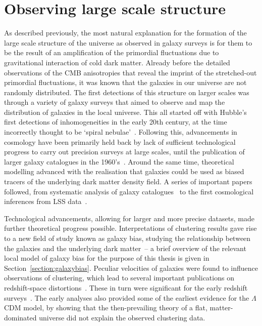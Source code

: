 \section{Observing large scale structure}

As described previously, the most natural explanation for the formation of the large scale structure of the universe as observed in galaxy surveys is for them to be the result of an amplification of the primordial fluctuations due to gravitational interaction of cold dark matter. Already before the detailed observations of the CMB anisotropies that reveal the imprint of the stretched-out primordial fluctuations, it was known that the galaxies in our universe are not randomly distributed. The first detections of this structure on larger scales was through a variety of galaxy surveys that aimed to observe and map the distribution of galaxies in the local universe. This all started off with Hubble's first detections of inhomogeneities in the early 20th century, at the time incorrectly thought to be `spiral nebulae'~\cite{Hubble:1926,Hubble:1934}. Following this, advancements in cosmology have been primarily held back by lack of sufficient technological progress to carry out precision surveys at large scales, until the publication of larger galaxy catalogues in the 1960's~\cite{Shane:1967,Zwicky:1961}. Around the same time, theoretical modelling advanced with the realisation that galaxies could be used as biased tracers of the underlying dark matter density field. A series of important papers followed, from systematic analysis of galaxy catalogues~\cite{Peebles:1973} to the first cosmological inferences from LSS data~\cite{Zeldovich:1970,Davis:1977mar,Davis:1977aug,Davis:1983,Peebles:1980,Maddox:1990,Baumgart:1991,Park:1992}. 

Technological advancements, allowing for larger and more precise datasets, made further theoretical progress possible. Interpretations of clustering results gave rise to a new field of study known as galaxy bias, studying the relationship between the galaxies and the underlying dark matter~\cite{Davis:1985,Rees:1985,Cole:1989vx,Kaiser:1984}-- a brief overview of the relevant local model of galaxy bias for the purpose of this thesis is given in Section~\ref{section:galaxybias}. Peculiar velocities of galaxies were found to influence observations of clustering, which lead to several important publications on redshift-space distortions~\cite{Kaiser:1987qv,Davis:1983,Hamilton:1992zz}. These in turn were significant for the early redshift surveys~\cite{Cole:1994wf,Loveday:1995gk,Tadros:1999ky}. The early analyses also provided some of the earliest evidence for the $\Lambda$CDM model, by showing that the then-prevailing theory of a flat, matter-dominated universe did not explain the observed clustering data.

